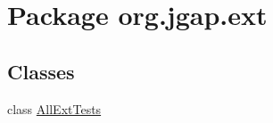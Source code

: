 \hypertarget{namespaceorg_1_1jgap_1_1ext}{\section{Package org.\-jgap.\-ext}
\label{namespaceorg_1_1jgap_1_1ext}
}
\subsection*{Classes}
\begin{DoxyCompactItemize}
\item 
class \hyperlink{classorg_1_1jgap_1_1ext_1_1_all_ext_tests}{All\-Ext\-Tests}
\end{DoxyCompactItemize}

